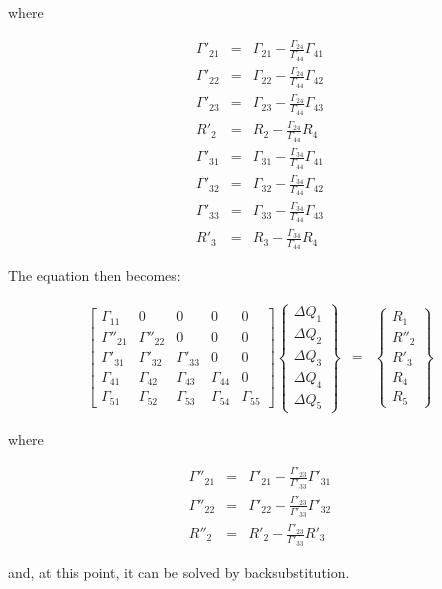 where

\begin{eqnarray}
\Gamma'_{21} &=&
\Gamma_{21} - \frac{\Gamma_{24}}{\Gamma_{44}} \Gamma_{41}
\nonumber
\\
\Gamma'_{22} &=&
\Gamma_{22} - \frac{\Gamma_{24}}{\Gamma_{44}} \Gamma_{42}
\nonumber
\\
\Gamma'_{23} &=&
\Gamma_{23} - \frac{\Gamma_{24}}{\Gamma_{44}} \Gamma_{43}
\nonumber
\\
R'_{2} &=&
R_{2} - \frac{\Gamma_{24}}{\Gamma_{44}} R_{4}
\nonumber
\\
\Gamma'_{31} &=&
\Gamma_{31} - \frac{\Gamma_{34}}{\Gamma_{44}} \Gamma_{41}
\nonumber
\\
\Gamma'_{32} &=&
\Gamma_{32} - \frac{\Gamma_{34}}{\Gamma_{44}} \Gamma_{42}
\nonumber
\\
\Gamma'_{33} &=&
\Gamma_{33} - \frac{\Gamma_{34}}{\Gamma_{44}} \Gamma_{43}
\nonumber
\\
R'_{3} &=&
R_{3} - \frac{\Gamma_{34}}{\Gamma_{44}} R_{4}
\nonumber
\end{eqnarray}

The equation then becomes:

\begin{eqnarray}
\left[
\begin{array}{ccccc}
\Gamma_{11} & 0 & 0 & 0 & 0 \\
\Gamma''_{21} & \Gamma''_{22} & 0 & 0 & 0  \\
\Gamma'_{31} & \Gamma'_{32} & \Gamma'_{33} & 0 & 0  \\
\Gamma_{41} & \Gamma_{42} & \Gamma_{43} & \Gamma_{44} & 0  \\
\Gamma_{51} & \Gamma_{52} & \Gamma_{53} & \Gamma_{54} & \Gamma_{55} 
\end{array}
\right]
\left\{
\begin{array}{c}
\Delta Q_1 \\
\Delta Q_2 \\
\Delta Q_3 \\
\Delta Q_4 \\
\Delta Q_5 
\end{array}
\right\}
&=&
\left\{
\begin{array}{c}
R_1 \\
R''_2 \\
R'_3 \\
R_4 \\
R_5 
\end{array}
\right\}
\nonumber
\end{eqnarray}

where

\begin{eqnarray}
\Gamma''_{21} &=&
\Gamma'_{21} - \frac{\Gamma'_{23}}{\Gamma'_{33}} \Gamma'_{31}
\nonumber
\\
\Gamma''_{22} &=&
\Gamma'_{22} - \frac{\Gamma'_{23}}{\Gamma'_{33}} \Gamma'_{32}
\nonumber
\\
R''_{2} &=&
R'_{2} - \frac{\Gamma'_{23}}{\Gamma'_{33}} R'_{3}
\nonumber
\end{eqnarray}

and, at this point, it can be solved by backsubstitution.
